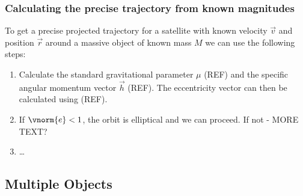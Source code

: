 %
%
%

\subsubsection{Calculating the precise trajectory from known magnitudes}
To get a precise projected trajectory for a satellite with known velocity $\vec{v}$ and position $\vec{r}$ around a massive object of known mass $M$ we can use the following steps:
\begin{enumerate}
  \item Calculate the standard gravitational parameter $\mu$ (REF) and the specific angular momentum vector $\vec{h}$ (REF). The eccentricity vector can then be calculated using (REF).
  \item If $\vnorm{e}<1$, the orbit is elliptical and we can proceed. If not - MORE TEXT?
  \item \ldots
\end{enumerate}

\subsection{Multiple Objects}

